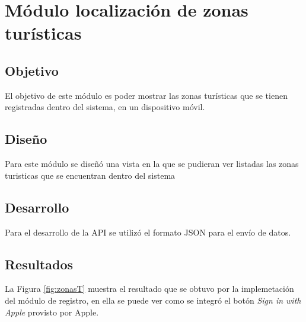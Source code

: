 \section{Módulo localización de zonas turísticas}

\subsection{Objetivo}
El objetivo de este módulo es poder mostrar las zonas turísticas que se tienen registradas dentro del sistema, en un dispositivo móvil.

\subsection{Diseño}

Para este módulo se diseñó una vista en la que se pudieran ver listadas las zonas turisticas que se encuentran dentro del sistema

\subsection{Desarrollo}

Para el desarrollo de la API se utilizó el formato JSON para el envío de datos.


\subsection{Resultados}

La Figura \ref{fig:zonasT} muestra el resultado que se obtuvo por la implemetación del módulo de registro, en ella se puede ver como se integró el botón \textit{Sign in with Apple} provisto por Apple. \\

